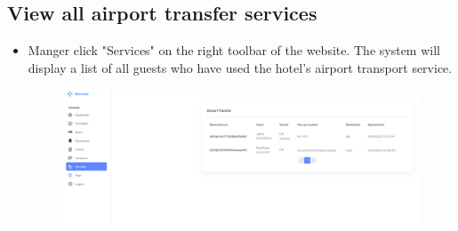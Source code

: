     \subsection{View all airport transfer services}
    \begin{itemize}
        \item Manger click "Services" on the right toolbar of the website. The system will display a list of all guests who have used the hotel's airport transport service.
        \begin{figure}[H]
            \includegraphics[width=1\linewidth]{img/transport.png}
            \label{fig:transport}
        \end{figure}
    \end{itemize}
    
    


